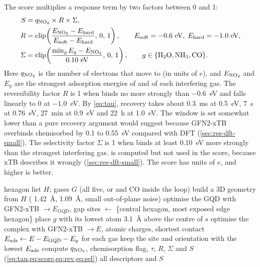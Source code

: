 The score multiplies a response term by two factors between 0 and 1:
\begin{align}
  S &= q_{\ce{NO2}} \times R \times \Sigma, \label{eq:score}\\
  R &= \operatorname{clip}\!\left(\frac{E_{\ce{NO2}} - E_{\mathrm{hard}}}{E_{\mathrm{soft}} - E_{\mathrm{hard}}},\,0,\,1\right),
      \qquad E_{\mathrm{soft}} = -0.6~\text{eV},\; E_{\mathrm{hard}} = -1.0~\text{eV}, \label{eq:rev}\\
  \Sigma &= \operatorname{clip}\!\left(\frac{\min_{g} E_g - E_{\ce{NO2}}}{0.10~\text{eV}},\,0,\,1\right),
      \qquad g \in \{\ce{H2O}, \ce{NH3}, \ce{CO}\}. \label{eq:sel}
\end{align}
Here \(q_{\ce{NO2}}\) is the number of electrons that move to  (in units of \(e\)), and
\(E_{\ce{NO2}}\) and \(E_g\) are the strongest adsorption energies of  and of each
interfering gas. The reversibility factor \(R\) is 1 when  binds no more strongly than
\(-0.6\)~eV and falls linearly to 0 at \(-1.0\)~eV. By \cref{eq:tau}, recovery takes about 0.3~ms
at 0.5~eV, 7~s at 0.76~eV, 27~min at 0.9~eV and 22~h at 1.0~eV. The window is set somewhat lower
than a pure recovery argument would suggest because GFN2-xTB overbinds chemisorbed  by 0.1
to 0.55~eV compared with DFT (\cref{sec:res-dft-small}). The selectivity factor \(\Sigma\) is 1
when  binds at least 0.10~eV more strongly than the strongest interfering gas.  is
computed but not used in the score, because xTB describes it wrongly (\cref{sec:res-dft-small}).
The score has units of \(e\), and higher is better.

\begin{algorithm}[ht]
  \caption{ sensing evaluation of one GQD ()}
  \label{alg:evaluate}
  \begin{algorithmic}[1]
    \Require hexagon list \(H\); gases \(G\) (all five, or  and CO inside the loop)
    \State build a 3D geometry from \(H\) ( 1.42~\AA,  1.09~\AA, small out-of-plane noise)
    \State optimise the GQD with GFN2-xTB \(\to E_{\mathrm{GQD}}\), gap
    \State sites \(\gets\) \{central hexagon, most exposed edge hexagon\}
     
      \State place \(g\) with its lowest atom 3.1~\AA{} above the centre of \(s\)
      \State optimise the complex with GFN2-xTB \(\to E\), atomic charges, shortest contact
      \State \(E_{\mathrm{ads}} \gets E - E_{\mathrm{GQD}} - E_g\)
    \EndFor
    \State for each gas keep the site and orientation with the lowest \(E_{\mathrm{ads}}\)
    \State compute \(q_{\ce{NO2}}\), chemisorption flag, \(\tau\), \(R\), \(\Sigma\) and \(S\)
           (\cref{eq:tau,eq:score,eq:rev,eq:sel})
    \State \Return all descriptors and \(S\)
  \end{algorithmic}
\end{algorithm}

